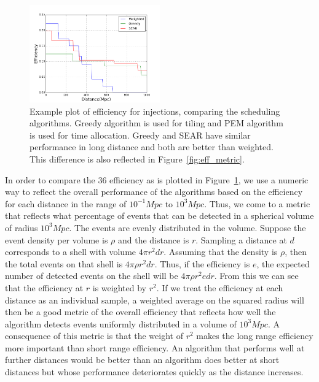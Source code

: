 \documentclass[twocolumn]{aastex61}
\begin{document}
\begin{figure}[t]
\centering
\includegraphics[width=0.5\textwidth]{plots/eff_ex.png}
\caption{Example plot of efficiency for \cite{Me2017} injections, comparing the scheduling algorithms. Greedy algorithm is used for tiling and PEM algorithm is used for time allocation. Greedy and SEAR have similar performance in long distance and both are better than weighted. This difference is also reflected in Figure~\ref{fig:eff_metric}.}
\label{fig:eff_ex}
\end{figure}
In order to compare the 36 efficiency as is plotted in Figure~\ref{fig:eff_ex}, we use a numeric way to reflect the overall performance of the algorithms based on the efficiency for each distance in the range of $10^{-1} Mpc$ to $10^3 Mpc$. Thus, we come to a metric that reflects what percentage of events that can be detected in a spherical volume of radius $10^3 Mpc$. The events are evenly distributed in the volume. Suppose the event density per volume is $\rho$ and the distance is $r$. Sampling a distance at $d$ corresponds to a shell with volume $4 \pi r^2 dr$. Assuming that the density is $\rho$, then the total events on that shell is $4 \pi \rho r^2 dr$. Thus, if the efficiency is $e$, the expected number of detected events on the shell will be $4 \pi \rho r^2 e dr$. From this we can see that the efficiency at $r$ is weighted by $r^2$. If we treat the efficiency at each distance as an individual sample, a weighted average on the squared radius will then be a good metric of the overall efficiency that reflects how well the algorithm detects events uniformly distributed in a volume of $10^3 Mpc$. A consequence of this metric is that the weight of $r^2$ makes the long range efficiency more important than short range efficiency. An algorithm that performs well at further distances would be better than an algorithm does better at short distances but whose performance deteriorates quickly as the distance increases.
\end{document}
